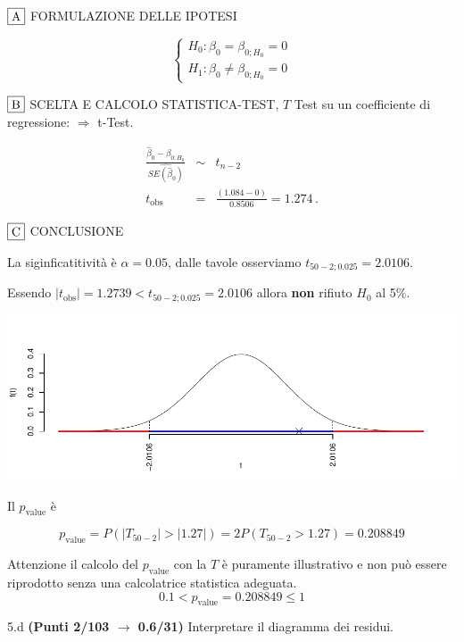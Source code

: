 \documentclass[
  11pt,
]{book}
\theoremstyle{mytheoremstyle}
\theoremstyle{mydefstyle}
\newenvironment{sol}
  {
  \begin{tcolorbox}[enhanced,breakable,arc=0.1mm,boxrule=1pt,colback=white,colframe=iblue,
  title=\bf \fontfamily{lmss}\selectfont \hspace{.5 cm} Soluzione,drop fuzzy shadow]

}{
\end{tcolorbox}
  }
\begin{document}
\begin{sol}
\(\fbox{A}\) FORMULAZIONE DELLE IPOTESI

\[\begin{cases}
   H_0: \beta_0 = \beta_{0;H_0}=0 \\
   H_1: \beta_0 \neq \beta_{0;H_0}=0 
   \end{cases}\]

\(\fbox{B}\) SCELTA E CALCOLO STATISTICA-TEST, \(T\)
Test su un coefficiente di regressione: \(\Rightarrow\) t-Test.

\begin{eqnarray*}
 \frac{\hat\beta_{ 0 } - \beta_{ 0 ;H_0}} {\widehat{SE(\hat\beta_{ 0 })}}&\sim&t_{n-2}\\
   t_{\text{obs}}
&=& \frac{ ( 1.084 -  0 )} { 0.8506 }
 =   1.274 \, .
\end{eqnarray*}

\(\fbox{C}\) CONCLUSIONE

La siginficatitività è \(\alpha=0.05\), dalle tavole osserviamo \(t_{50-2;0.025}=2.0106\).

Essendo \(|t_\text{obs}|=1.2739<t_{50-2;0.025}=2.0106\) allora \textbf{non} rifiuto \(H_0\) al 5\%.

\begin{center}\includegraphics{Esami_passati_con_soluzioni_files/figure-latex/2023-38,-1} \end{center}

Il \(p_{\text{value}}\) è

\[ p_{\text{value}} = P(|T_{50-2}|>|1.27|)=2P(T_{50-2}>1.27)=0.208849 \]

Attenzione il calcolo del \(p_\text{value}\) con la \(T\) è puramente illustrativo e non può essere riprodotto senza una calcolatrice statistica adeguata.\[
 0.1 < p_\text{value}= 0.208849 \leq 1 
\]

\end{sol}

5.d \textbf{(Punti 2/103 \(\rightarrow\) 0.6/31)} Interpretare il diagramma dei residui.
\end{document}
